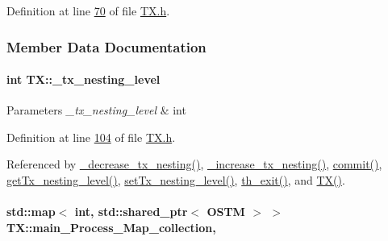Definition at line \hyperlink{_t_x_8h_source_l00070}{70} of file \hyperlink{_t_x_8h_source}{T\+X.\+h}.



\subsubsection{Member Data Documentation}
\paragraph[{\texorpdfstring{\+\_\+tx\+\_\+nesting\+\_\+level}{_tx_nesting_level}}]{\setlength{\rightskip}{0pt plus 5cm}int T\+X\+::\+\_\+tx\+\_\+nesting\+\_\+level\hspace{0.3cm}{\ttfamily [private]}}\hypertarget{class_t_x_ae8f413fd7f4fea322e7ad3c668f9898e_ae8f413fd7f4fea322e7ad3c668f9898e}{}\label{class_t_x_ae8f413fd7f4fea322e7ad3c668f9898e_ae8f413fd7f4fea322e7ad3c668f9898e}

\begin{DoxyParams}{Parameters}
{\em \+\_\+tx\+\_\+nesting\+\_\+level} & int \\
\hline
\end{DoxyParams}


Definition at line \hyperlink{_t_x_8h_source_l00104}{104} of file \hyperlink{_t_x_8h_source}{T\+X.\+h}.



Referenced by \hyperlink{_t_x_8cpp_source_l00316}{\+\_\+decrease\+\_\+tx\+\_\+nesting()}, \hyperlink{_t_x_8cpp_source_l00307}{\+\_\+increase\+\_\+tx\+\_\+nesting()}, \hyperlink{_t_x_8cpp_source_l00202}{commit()}, \hyperlink{_t_x_8cpp_source_l00374}{get\+Tx\+\_\+nesting\+\_\+level()}, \hyperlink{_t_x_8cpp_source_l00370}{set\+Tx\+\_\+nesting\+\_\+level()}, \hyperlink{_t_x_8cpp_source_l00052}{th\+\_\+exit()}, and \hyperlink{_t_x_8cpp_source_l00031}{T\+X()}.

\paragraph[{\texorpdfstring{main\+\_\+\+Process\+\_\+\+Map\+\_\+collection}{main_Process_Map_collection}}]{\setlength{\rightskip}{0pt plus 5cm}std\+::map$<$ int, std\+::shared\+\_\+ptr$<$ {\bf O\+S\+TM} $>$ $>$ T\+X\+::main\+\_\+\+Process\+\_\+\+Map\+\_\+collection\hspace{0.3cm}{\ttfamily [static]}, {\ttfamily [private]}}\hypertarget{class_t_x_a1a45d726894190695314464d7cd97c29_a1a45d726894190695314464d7cd97c29}{}\label{class_t_x_a1a45d726894190695314464d7cd97c29_a1a45d726894190695314464d7cd97c29}



